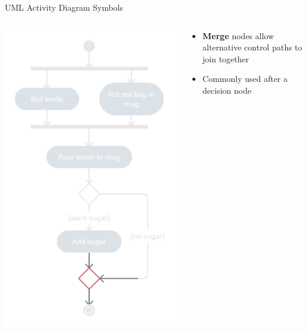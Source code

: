 \begin{frame}{UML Activity Diagram Symbols}
	\begin{columns}
		\begin{column}{0.4\textwidth}
			\includegraphics[width=\textwidth]{ad_merge}
		\end{column}
		\begin{column}{0.58\textwidth}
			\begin{itemize}
				\pause\item \textbf{Merge} nodes allow alternative control paths to join together
				\pause\item Commonly used after a decision node
			\end{itemize}
		\end{column}
	\end{columns}
\end{frame}

